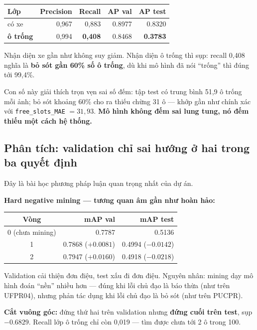 \documentclass[12pt]{ai_conquer2026}
\begin{document}
\begin{center}
\begin{tabular}{|l|r|r|r|r|}
\hline
\textbf{Lớp} & \textbf{Precision} & \textbf{Recall} & \textbf{AP val} & \textbf{AP test} \\
\hline
có xe & 0,967 & 0,883 & 0.8977 & 0.8320 \\
\textbf{ô trống} & 0,994 & \textbf{0,408} & 0.8468 & \textbf{0.3783} \\
\hline
\end{tabular}
\end{center}

Nhận diện xe gần như không suy giảm. Nhận diện ô trống thì sụp: recall 0,408 nghĩa là \textbf{bỏ sót gần 60\% số ô trống}, dù khi mô hình đã nói ``trống'' thì đúng tới 99,4\%.

Con số này giải thích trọn vẹn sai số đếm: tập test có trung bình 51,9 ô trống mỗi ảnh; bỏ sót khoảng 60\% cho ra thiếu chừng 31 ô --- khớp gần như chính xác với \texttt{free\_slots\_MAE} $= 31{,}93$. \textbf{Mô hình không đếm sai lung tung, nó đếm thiếu một cách hệ thống.}

\subsection{Phân tích: validation chỉ sai hướng ở hai trong ba quyết định}

Đây là bài học phương pháp luận quan trọng nhất của dự án.

\textbf{Hard negative mining --- tương quan âm gần như hoàn hảo:}

\begin{center}
\begin{tabular}{|c|r|r|}
\hline
\textbf{Vòng} & \textbf{mAP val} & \textbf{mAP test} \\
\hline
0 (chưa mining) & 0.7787 & 0.5136 \\
1 & 0.7868 \quad($+0.0081$) & 0.4994 \quad($-0.0142$) \\
2 & 0.7947 \quad($+0.0160$) & 0.4918 \quad($-0.0218$) \\
\hline
\end{tabular}
\end{center}

Validation cải thiện đơn điệu, test xấu đi đơn điệu. Nguyên nhân: mining dạy mô hình đoán ``nền'' nhiều hơn --- đúng khi lỗi chủ đạo là báo thừa (như trên UFPR04), nhưng phản tác dụng khi lỗi chủ đạo là bỏ sót (như trên PUCPR).

\textbf{Cắt vuông góc:} đứng thứ hai trên validation nhưng \textbf{đứng cuối trên test}, sụp $-0.6829$. Recall lớp ô trống chỉ còn 0,019 --- tìm được chưa tới 2 ô trong 100.
\end{document}
